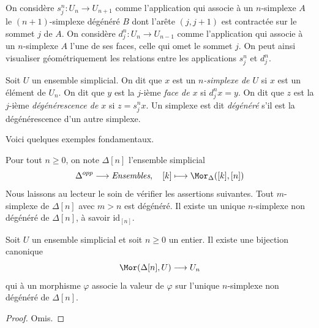 \medskip\noindent
On considère $s^n_j : U_n \to U_{n + 1}$ comme l'application qui associe
à un $n$-simplexe $A$ le $(n + 1)$-simplexe dégénéré $B$ dont l'arête
$(j, j + 1)$ est contractée sur le sommet $j$ de $A$. On considère
$d^n_j : U_n \to U_{n - 1}$ comme l'application qui associe à un
$n$-simplexe $A$ l'une de ses faces, celle qui omet le sommet $j$.
On peut ainsi visualiser géométriquement les relations entre les
applications $s^n_j$ et $d^n_j$.

\begin{definition}
\label{definition-terminology-simplicial-sets}
Soit $U$ un ensemble simplicial. On dit que $x$ est un
{\it $n$-simplexe de $U$} si $x$ est un élément de $U_n$. On dit que
$y$ est la $j$-ième {\it face de $x$} si $d^n_jx = y$. On dit que
$z$ est la $j$-ième {\it dégénérescence de $x$} si $z = s^n_jx$.
Un simplexe est dit {\it dégénéré} s'il est la dégénérescence d'un autre
simplexe.
\end{definition}

\noindent
Voici quelques exemples fondamentaux.

\begin{example}
\label{example-simplex-simplicial-set}
Pour tout $n \geq 0$, on note $\Delta[n]$ l'ensemble simplicial
$$
\Delta^{opp} \longrightarrow \textit{Ensembles},\quad
[k] \longmapsto \Mor_{\Delta}([k], [n])
$$
Nous laissons au lecteur le soin de vérifier les assertions suivantes.
Tout $m$-simplexe de $\Delta[n]$ avec $m > n$ est dégénéré.
Il existe un unique $n$-simplexe non dégénéré de $\Delta[n]$, à savoir
$\text{id}_{[n]}$.
\end{example}

\begin{lemma}
\label{lemma-simplex-map}
Soit $U$ un ensemble simplicial et soit $n \geq 0$ un entier.
Il existe une bijection canonique
$$
\Mor(\Delta[n], U)
\longrightarrow
U_n
$$
qui à un morphisme $\varphi$ associe la valeur de $\varphi$ sur l'unique
$n$-simplexe non dégénéré de $\Delta[n]$.
\end{lemma}

\begin{proof}
Omis.
\end{proof}


